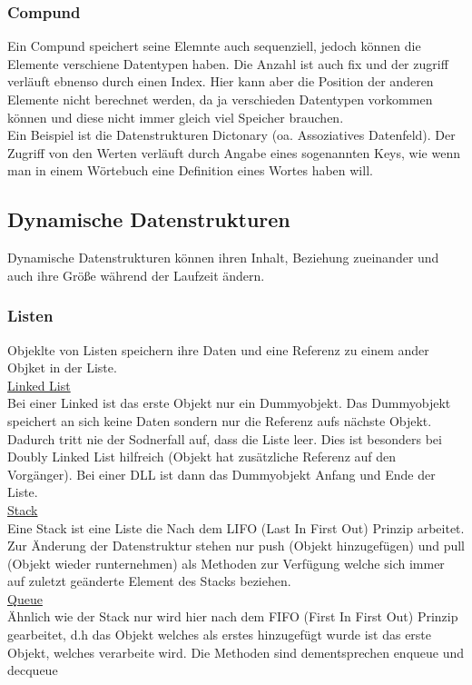 \documentclass[a4paper]{scrartcl}
\begin{document}
            \subsubsection*{Compund}
                Ein Compund speichert seine Elemnte auch sequenziell, jedoch können die Elemente verschiene Datentypen haben. Die Anzahl ist auch fix und der zugriff verläuft ebnenso durch einen Index.
                Hier kann aber die Position der anderen Elemente nicht berechnet werden, da ja verschieden Datentypen vorkommen können und diese nicht immer gleich viel Speicher brauchen. \\
                Ein Beispiel ist die Datenstrukturen Dictonary (oa. Assoziatives Datenfeld). Der Zugriff von den Werten verläuft durch Angabe eines sogenannten Keys, wie wenn man in einem Wörtebuch 
                eine Definition eines Wortes haben will. 
            
        \subsection{Dynamische Datenstrukturen}
            Dynamische Datenstrukturen können ihren Inhalt, Beziehung zueinander und auch ihre Größe während der Laufzeit ändern.
            
            \subsubsection*{Listen}  
            Objeklte von Listen speichern ihre Daten und eine Referenz zu einem ander Objket in der Liste. \\            
            \underline{Linked List} \hfill \\
            Bei einer Linked ist das erste Objekt nur ein Dummyobjekt. Das Dummyobjekt speichert an sich  keine Daten sondern nur die Referenz aufs nächste Objekt.
            Dadurch tritt nie der Sodnerfall auf, dass die Liste leer. Dies ist besonders bei Doubly Linked List hilfreich (Objekt hat zusätzliche Referenz auf
            den Vorgänger). Bei einer DLL ist dann das Dummyobjekt Anfang und Ende der Liste.\\
            \underline{Stack} \hfill \\
            Eine Stack ist eine Liste die Nach dem LIFO (Last In First Out) Prinzip arbeitet. Zur Änderung der Datenstruktur stehen nur push (Objekt hinzugefügen) und  pull (Objekt wieder runternehmen)
            als Methoden zur Verfügung welche sich immer auf zuletzt geänderte Element des Stacks beziehen. \\
            \underline{Queue} \hfill \\
            Ähnlich wie der Stack nur wird hier nach dem FIFO (First In First Out) Prinzip gearbeitet, d.h das Objekt welches als erstes hinzugefügt wurde ist das erste Objekt, welches 
            verarbeite wird. Die Methoden sind dementsprechen enqueue und decqueue 
\end{document}
